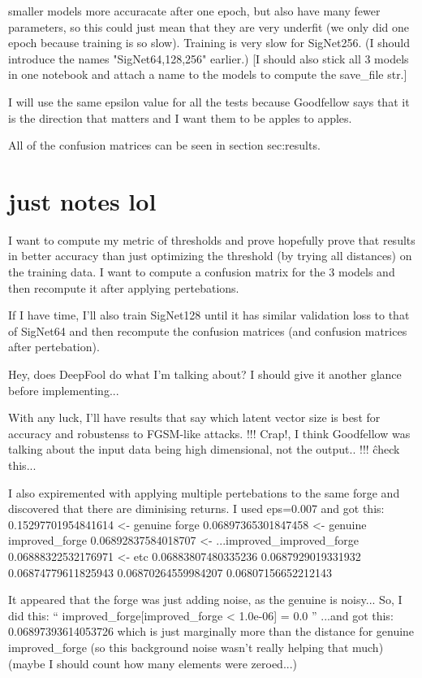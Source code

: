 smaller models more accuracate after one epoch, but also have many fewer parameters, so this could just mean that they are very underfit (we only did one epoch because training is so slow).
Training is very slow for SigNet256.
(I should introduce the names "SigNet64,128,256" earlier.)
[I should also stick all 3 models in one notebook and attach a name to the models to compute the save\_file str.]

I will use the same epsilon value for all the tests because Goodfellow says that it is the direction that matters and I want them to be apples to apples.

All of the confusion matrices can be seen in section {sec:results}.



\section{just notes lol}
I want to compute my metric of thresholds and prove hopefully prove that results in better accuracy than just optimizing the threshold (by trying all distances) on the training data.
I want to compute a confusion matrix for the 3 models and then recompute it after applying pertebations.

If I have time, I'll also train SigNet128 until it has similar validation loss to that of SigNet64 and then recompute the confusion matrices (and confusion matrices after pertebation).

Hey, does DeepFool do what I'm talking about?
    I should give it another glance before implementing...

With any luck, I'll have results that say which latent vector size is best for accuracy and robustenss to FGSM-like attacks.
!!! Crap!, I think Goodfellow was talking about the input data being high dimensional, not the output.. !!!
    \^check this...


I also expiremented with applying multiple pertebations to the same forge and discovered that there are diminising returns.
I used eps=0.007 and got this:
0.15297701954841614 <- genuine forge
0.06897365301847458 <- genuine improved_forge
0.06892837584018707 <- ...improved_improved_forge
0.06888322532176971 <- etc
0.06883807480335236
0.0687929019331932
0.06874779611825943
0.06870264559984207
0.06807156652212143

It appeared that the forge was just adding noise, as the genuine is noisy...
So, I did this:
``
improved_forge[improved_forge < 1.0e-06] = 0.0
''
...and got this:
0.06897393614053726
which is just marginally more than the distance for genuine improved_forge
(so this background noise wasn't really helping that much)
(maybe I should count how many elements were zeroed...)

